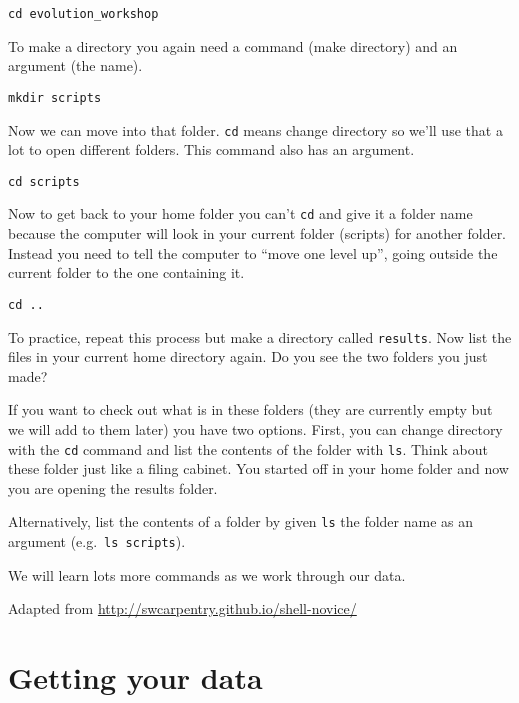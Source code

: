 \documentclass[
]{book}
\begin{document}
\begin{verbatim}
cd evolution_workshop
\end{verbatim}

To make a directory you again need a command (make directory) and an argument (the name).

\begin{verbatim}
mkdir scripts 
\end{verbatim}

Now we can move into that folder.
\texttt{cd} means change directory so we'll use that a lot to open different folders.
This command also has an argument.

\begin{verbatim}
cd scripts 
\end{verbatim}

Now to get back to your home folder you can't \texttt{cd} and give it a folder name because
the computer will look in your current folder (scripts) for another folder.
Instead you need to tell the computer to ``move one level up'', going outside the current folder to the one containing it.

\begin{verbatim}
cd ..
\end{verbatim}

To practice, repeat this process but make a directory called \texttt{results}.
Now list the files in your current home directory again.
Do you see the two folders you just made?

If you want to check out what is in these folders (they are currently empty but we will add to them later)
you have two options.
First, you can change directory with the \texttt{cd} command and list the contents of the folder with \texttt{ls}.
Think about these folder just like a filing cabinet.
You started off in your home folder and now you are opening the results folder.

Alternatively, list the contents of a folder by given \texttt{ls} the folder name as an argument (e.g.~\texttt{ls\ scripts}).

We will learn lots more commands as we work through our data.

Adapted from \url{http://swcarpentry.github.io/shell-novice/}

\hypertarget{getting-your-data}{%
\chapter{Getting your data}\label{getting-your-data}}
\end{document}
